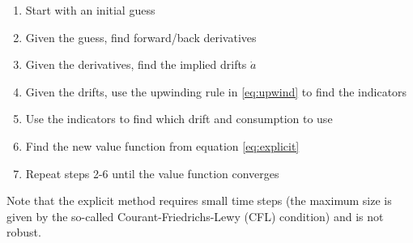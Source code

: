 \documentclass[12pt]{article}
\DeclareMathOperator{\1}{\mathbbm{1}}
\begin{document}
\begin{enumerate}
\item Start with an initial guess
\item Given the guess, find forward/back derivatives
\item Given the derivatives, find the implied drifts $\dot a$
\item Given the drifts, use the upwinding rule in \eqref{eq:upwind} to find the indicators
\item Use the indicators to find which drift and consumption to use
\item Find the new value function from equation \eqref{eq:explicit}
\item Repeat steps 2-6 until the value function converges
\end{enumerate}

Note that the explicit method requires small time steps (the maximum size is given by the so-called Courant-Friedrichs-Lewy (CFL) condition) and is not robust.
\end{document}
